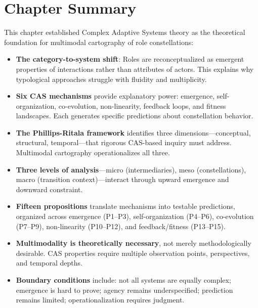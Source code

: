 \documentclass[../main.tex]{subfiles}
\begin{document}
\section{Chapter Summary}

\begin{summarybox}
This chapter established Complex Adaptive Systems theory as the theoretical foundation for multimodal cartography of role constellations:

\begin{itemize}[leftmargin=*, itemsep=0.3em]
\item \textbf{The category-to-system shift}: Roles are reconceptualized as emergent properties of interactions rather than attributes of actors. This explains why typological approaches struggle with fluidity and multiplicity.

\item \textbf{Six CAS mechanisms} provide explanatory power: emergence, self-organization, co-evolution, non-linearity, feedback loops, and fitness landscapes. Each generates specific predictions about constellation behavior.

\item \textbf{The Phillips-Ritala framework} identifies three dimensions---conceptual, structural, temporal---that rigorous CAS-based inquiry must address. Multimodal cartography operationalizes all three.

\item \textbf{Three levels of analysis}---micro (intermediaries), meso (constellations), macro (transition context)---interact through upward emergence and downward constraint.

\item \textbf{Fifteen propositions} translate mechanisms into testable predictions, organized across emergence (P1--P3), self-organization (P4--P6), co-evolution (P7--P9), non-linearity (P10--P12), and feedback/fitness (P13--P15).

\item \textbf{Multimodality is theoretically necessary}, not merely methodologically desirable. CAS properties require multiple observation points, perspectives, and temporal depths.

\item \textbf{Boundary conditions} include: not all systems are equally complex; emergence is hard to prove; agency remains underspecified; prediction remains limited; operationalization requires judgment.
\end{itemize}
\end{summarybox}
\end{document}
